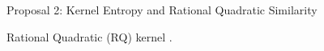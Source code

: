 \documentclass[aspectratio=169]{beamer}
\let\oldcite\cite
\renewcommand{\cite}[1]{{\tiny\oldcite{#1}}}
\begin{document}
\begin{frame}{Proposal 2: Kernel Entropy and Rational Quadratic Similarity}
\begin{enumerate}
\begin{block}{Rational Quadratic (RQ) kernel {\scriptsize \cite{rasmussen2006gaussian}.}}
\end{block}

\end{enumerate}





\end{frame}
\end{document}
